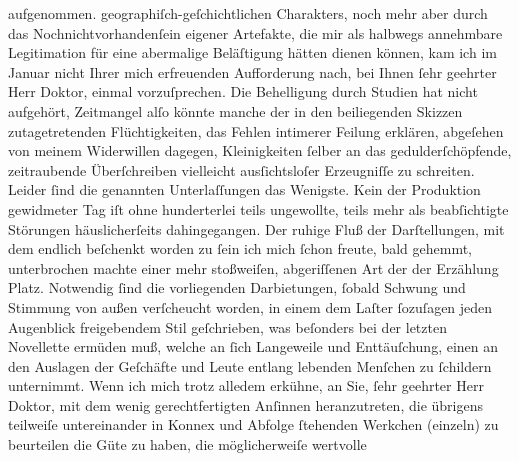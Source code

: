 \begin{ledgroupsized}[t]{13cm}
{{{                  aufgenommen.}}}\label{K_L01792-1h} geographiſch-geſchichtlichen Charakters, noch mehr aber durch
               das Nochnichtvorhandenſein eigener Artefakte, die mir als halbwegs annehmbare
               Legitimation für eine abermalige Beläſtigung hätten dienen können, kam ich im
                  Januar nicht Ihrer mich erfreuenden Aufforderung nach, bei Ihnen ſehr
               geehrter Herr Doktor, einmal vorzuſprechen. Die Behelligung durch Studien hat nicht
               aufgehört, Zeitmangel alſo könnte manche der in den beiliegenden Skizzen
               zutagetretenden Flüchtigkeiten, das Fehlen intimerer Feilung erklären, {\pb}abgeſehen von meinem Widerwillen dagegen,
               Kleinigkeiten ſelber an das gedulderſchöpfende, zeitraubende Überſchreiben vielleicht
               ausſichtsloſer Erzeugniſſe zu schreiten. Leider ſind die genannten Unterlaſſungen das
               Wenigste. Kein der Produktion gewidmeter Tag iſt ohne hunderterlei teils ungewollte,
               teils mehr als beabſichtigte Störungen häuslicherſeits dahingegangen. Der ruhige Fluß
               der Darſtellungen, mit dem endlich beſchenkt worden zu ſein ich mich ſchon freute,
               bald gehemmt, unterbrochen machte einer mehr stoßweiſen, abgeriſſenen Art der
               der Erzählung Platz. Notwendig ſind die vorliegenden Darbietungen, ſobald
               Schwung {\pb}und Stimmung von außen
               verſcheucht worden, in einem dem Laſter ſozuſagen jeden Augenblick freigebendem Stil
               geſchrieben, was beſonders bei der letzten Novellette ermüden muß, welche an ſich Langeweile und
               Enttäuſchung, einen an den Auslagen der Geſchäfte und Leute entlang lebenden Menſchen
               zu ſchildern unternimmt. Wenn ich mich trotz alledem erkühne, an Sie, ſehr geehrter
               Herr Doktor, mit dem wenig gerechtfertigten Anſinnen heranzutreten, die übrigens
               teilweiſe untereinander in Konnex und Abfolge ſtehenden Werkchen (einzeln) zu
               beurteilen die Güte zu haben, {\pb}die
               möglicherweiſe wertvolle \label{K_L01792-2v}
\end{ledgroupsized}

